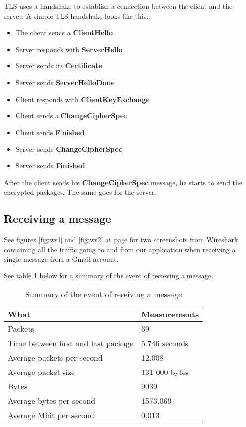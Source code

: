 \newpage

TLS uses a handshake to establish a connection between the client and the server.
A simple TLS handshake looks like this:
\begin{itemize}
\item{}The client sends a \textbf{ClientHello}
\item{}Server responds with \textbf{ServerHello}
\item{}Server sends its \textbf{Certificate}
\item{}Server sends \textbf{ServerHelloDone}
\item{}Client responds with \textbf{ClientKeyExchange}
\item{}Client sends a \textbf{ChangeCipherSpec}
\item{}Client sends \textbf{Finished}
\item{}Server sends \textbf{ChangeCipherSpec}
\item{}Server sends \textbf{Finished}
\end{itemize}

After the client sends his \textbf{ChangeCipherSpec} message, he starts to send the encrypted packages. The same goes for the server. 

\subsection{Receiving a message}

See figures \ref{fig:ws1} and \ref{fig:ws2} at page \pageref{fig:ws1} for two screenshots from Wireshark containing all the traffic going to and from our application when receiving a single message from a Gmail account.

See table \ref{tab:summaryrecmes} below for a summary of the event of recieving a message.
\begin{table}[h!]
\begin{center}
\begin{tabular}{l|l} \hline
\textbf{What} & \textbf{Measurements} \\ \hline \hline
Packets & 69 \\
Time between first and last package & 5.746 seconds \\
Average packets per second & 12.008 \\
Average packet size & 131 000 bytes \\
Bytes & 9039 \\
Average bytes per second & 1573.069 \\
Average Mbit per second & 0.013 \\ \hline
\end{tabular}
\end{center}
\caption{Summary of the event of receiving a message} \label{tab:summaryrecmes}
\end{table}

